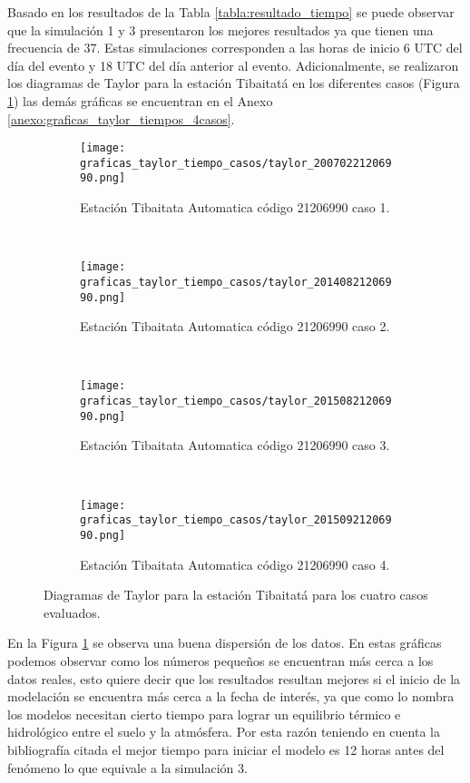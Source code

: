 Basado en los resultados de la Tabla \ref{tabla:resultado_tiempo} se puede observar que la simulación 1 y 3 presentaron los mejores resultados ya que tienen una frecuencia de 37. Estas simulaciones corresponden a las horas de inicio 6 UTC del día del evento y 18 UTC del día anterior al evento. Adicionalmente, se realizaron los diagramas de Taylor para la estación Tibaitatá en los diferentes casos (Figura \ref{fig:taylor_tiempo}) las demás gráficas se encuentran en el Anexo \ref{anexo:graficas_taylor_tiempos_4casos}.

\begin{figure}[H]
    \centering
    
\begin{subfigure}[normla]{0.4\textwidth}
\texttt{[image: graficas\_taylor\_tiempo\_casos/taylor\_20070221206990.png]}
\caption{Estación Tibaitata Automatica  código 21206990 caso 1.}
\end{subfigure}
~
\begin{subfigure}[normla]{0.4\textwidth}
\texttt{[image: graficas\_taylor\_tiempo\_casos/taylor\_20140821206990.png]}
\caption{Estación Tibaitata Automatica  código 21206990 caso 2.}
\end{subfigure}
~
\begin{subfigure}[normla]{0.4\textwidth}
\texttt{[image: graficas\_taylor\_tiempo\_casos/taylor\_20150821206990.png]}
\caption{Estación Tibaitata Automatica  código 21206990 caso 3.}
\end{subfigure}
~
\begin{subfigure}[normla]{0.4\textwidth}
\texttt{[image: graficas\_taylor\_tiempo\_casos/taylor\_20150921206990.png]}
\caption{Estación Tibaitata Automatica  código 21206990 caso 4.}
\end{subfigure}
    
    \caption{Diagramas de Taylor para la estación Tibaitatá para los cuatro casos evaluados.}
    \label{fig:taylor_tiempo}
\end{figure}

En la Figura \ref{fig:taylor_tiempo} se observa una buena dispersión de los datos. En estas gráficas podemos observar como los números pequeños se encuentran más cerca a los datos reales, esto quiere decir que los resultados resultan mejores si el inicio de la modelación se encuentra más cerca a la fecha de interés, ya que como lo nombra \citet{Kovacik2007} los modelos necesitan cierto tiempo para lograr un equilibrio térmico e hidrológico entre el suelo y la atmósfera. Por esta razón teniendo en cuenta la bibliografía citada el mejor tiempo para iniciar el modelo es 12 horas antes del fenómeno lo que equivale a la simulación 3.

